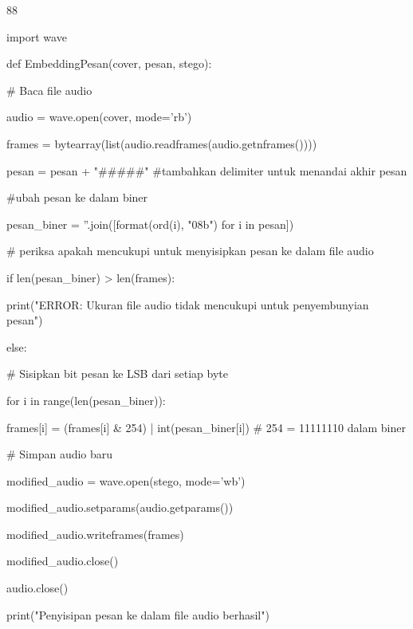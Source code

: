 \documentclass{article}
\begin{document}

88

import wave

def EmbeddingPesan(cover, pesan, stego):  


\# Baca file audio 

     audio = wave.open(cover, mode='rb’)

     frames = bytearray(list(audio.readframes(audio.getnframes())))

     pesan = pesan + "\#\#\#\#\#"   \#tambahkan delimiter untuk menandai akhir pesan

     \#ubah pesan ke  dalam biner  

     pesan\_biner = ''.join([format(ord(i), "08b") for i in pesan])

     \# periksa apakah mencukupi untuk menyisipkan pesan ke dalam file audio 

     if len(pesan\_biner) > len(frames):     

        print("ERROR: Ukuran file audio tidak mencukupi untuk penyembunyian pesan")    

     else:

        \# Sisipkan bit pesan ke LSB dari setiap byte

        for i in range(len(pesan\_biner)):

            frames[i] = (frames[i] \& 254) | int(pesan\_biner[i]) \# 254 = 11111110 dalam biner


     \# Simpan audio baru

     modified\_audio = wave.open(stego, mode='wb')

     modified\_audio.setparams(audio.getparams())

     modified\_audio.writeframes(frames)

     modified\_audio.close()

     audio.close()

     print("Penyisipan pesan ke dalam file audio berhasil")
\end{document}

